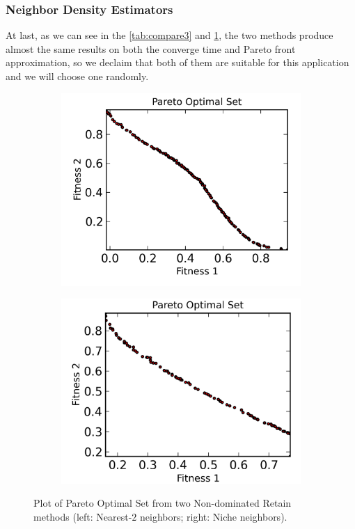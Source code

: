 \documentclass[12pt, runningheads,a4paper]{llncs}
\begin{document}
\subsubsection{Neighbor Density Estimators}
At last, as we can see in the \ref{tab:compare3} and \ref{fig:density}, the two methods produce almost the same results on both the converge time and Pareto front approximation, so we declaim that both of them are suitable for this application and we will choose one randomly.
\begin{figure}
        \centering
        \begin{subfigure}[b]{0.4\textwidth}
                \centering
                \includegraphics[width=\textwidth]{./figs/simpleretain.png}
        \end{subfigure}
        \begin{subfigure}[b]{0.4\textwidth}
                \centering
                \includegraphics[width=\textwidth]{./figs/edominance.png}
        \end{subfigure}
        \caption{Plot of Pareto Optimal Set from two Non-dominated Retain methods (left: Nearest-$2$ neighbors; right: Niche neighbors).}\label{fig:density}
\end{figure}
\end{document}
